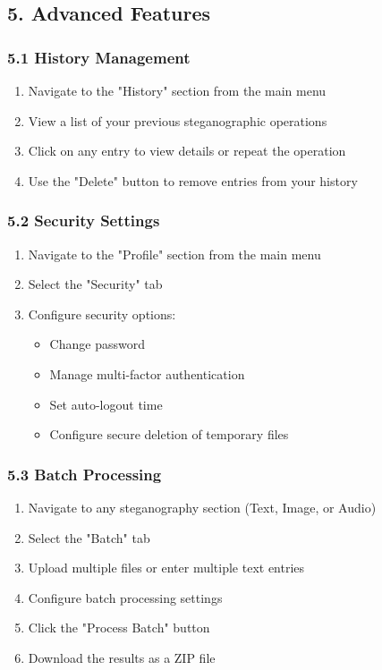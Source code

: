 \documentclass[12pt, a4paper, oneside]{book}
\begin{document}
\subsection*{5. Advanced Features}

\subsubsection*{5.1 History Management}

\begin{enumerate}
    \item Navigate to the "History" section from the main menu
    \item View a list of your previous steganographic operations
    \item Click on any entry to view details or repeat the operation
    \item Use the "Delete" button to remove entries from your history
\end{enumerate}

\subsubsection*{5.2 Security Settings}

\begin{enumerate}
    \item Navigate to the "Profile" section from the main menu
    \item Select the "Security" tab
    \item Configure security options:
    \begin{itemize}
        \item Change password
        \item Manage multi-factor authentication
        \item Set auto-logout time
        \item Configure secure deletion of temporary files
    \end{itemize}
\end{enumerate}

\subsubsection*{5.3 Batch Processing}

\begin{enumerate}
    \item Navigate to any steganography section (Text, Image, or Audio)
    \item Select the "Batch" tab
    \item Upload multiple files or enter multiple text entries
    \item Configure batch processing settings
    \item Click the "Process Batch" button
    \item Download the results as a ZIP file
\end{enumerate}
\end{document}
